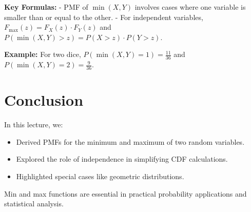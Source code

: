 \documentclass{article}
\begin{document}
\textbf{Key Formulas:}
- PMF of $\min(X, Y)$ involves cases where one variable is smaller than or equal to the other.
- For independent variables, $F_{\max}(z) = F_X(z) \cdot F_Y(z)$ and $P(\min(X, Y) > z) = P(X > z) \cdot P(Y > z)$.

\textbf{Example:}
For two dice, $P(\min(X, Y) = 1) = \frac{11}{36}$ and $P(\min(X, Y) = 2) = \frac{9}{36}$.

\section*{Conclusion}

In this lecture, we:
\begin{itemize}
  \item Derived PMFs for the minimum and maximum of two random variables.
  \item Explored the role of independence in simplifying CDF calculations.
  \item Highlighted special cases like geometric distributions.
\end{itemize}

Min and max functions are essential in practical probability applications and statistical analysis.
\end{document}
